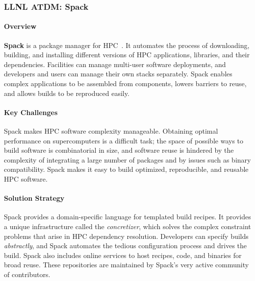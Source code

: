 \subsubsection{ LLNL ATDM: Spack}

\paragraph{Overview}

{\bf Spack} is a package manager for
HPC~\cite{stewart+:sc19-spack-bof,gamblin+:sc19-spack-tutorial,gamblin+:lanl-spack-tutorial-2019,gamblin+:doe-nsf-spack-tutorial,baber+:pearc19-spack-tutorial,gamblin+:isc19-spack-tutorial,gamblin+:ecp19-spack-roundtable,gamblin+:ecp19-spack-tutorial,gamblin+:sc18-spack-bof,gamblin+:sc18-spack-tutorial,gamblin+:ecp18-spack-sotu,gamblin+:ecp18-spack-tutorial,gamblin+:sc17-spack-tutorial,gamblin:hpckp17,gamblin+:llnl-spack-tutorial-17,gamblin+:sc16-spack-tutorial}.
It automates the process of downloading, building, and installing
different versions of HPC applications, libraries, and their
dependencies.  Facilities can manage multi-user software deployments, and
developers and users can manage their own stacks separately.  Spack
enables complex applications to be assembled from components, lowers
barriers to reuse, and allows builds to be reproduced easily.

\paragraph{Key Challenges}
Spack makes HPC software complexity manageable. Obtaining optimal
performance on supercomputers is a difficult task; the space of possible
ways to build software is combinatorial in size, and software reuse is
hindered by the complexity of integrating a large number of packages and
by issues such as binary compatibility.  Spack makes it easy to build
optimized, reproducible, and reusable HPC software.

\paragraph{Solution Strategy}
Spack provides a domain-specific language for templated build recipes.
It provides a unique infrastructure called the {\it concretizer}, which
solves the complex constraint problems that arise in HPC dependency
resolution.  Developers can specify builds {\it abstractly}, and Spack
automates the tedious configuration process and drives the build. Spack
also includes online services to host recipes, code, and binaries for
broad reuse.  These repositories are maintained by Spack's very active
community of contributors.

